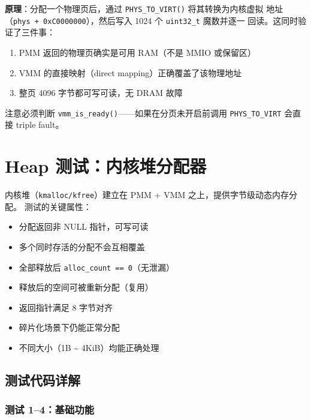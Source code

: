 \textbf{原理}：分配一个物理页后，通过 \texttt{PHYS\_TO\_VIRT()} 将其转换为内核虚拟
地址（\texttt{phys + 0xC0000000}），然后写入 1024 个 \texttt{uint32\_t} 魔数并逐一
回读。这同时验证了三件事：
\begin{enumerate}
  \item PMM 返回的物理页确实是可用 RAM（不是 MMIO 或保留区）
  \item VMM 的直接映射（direct mapping）正确覆盖了该物理地址
  \item 整页 4096 字节都可写可读，无 DRAM 故障
\end{enumerate}

注意必须判断 \texttt{vmm\_is\_ready()}——如果在分页未开启前调用 \texttt{PHYS\_TO\_VIRT}
会直接 triple fault。

\section{Heap 测试：内核堆分配器}
\label{sec:test-heap}

内核堆（\texttt{kmalloc/kfree}）建立在 PMM + VMM 之上，提供字节级动态内存分配。
测试的关键属性：

\begin{itemize}
  \item 分配返回非 NULL 指针，可写可读
  \item 多个同时存活的分配不会互相覆盖
  \item 全部释放后 \texttt{alloc\_count == 0}（无泄漏）
  \item 释放后的空间可被重新分配（复用）
  \item 返回指针满足 8 字节对齐
  \item 碎片化场景下仍能正常分配
  \item 不同大小（1B \textasciitilde{} 4KiB）均能正确处理
\end{itemize}

\subsection{测试代码详解}


\subsubsection{测试 1--4：基础功能}

